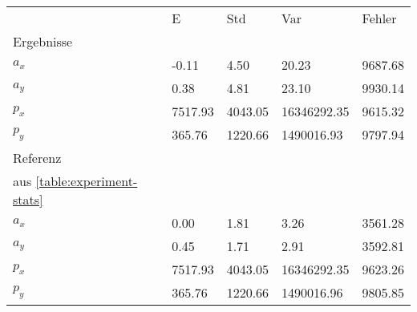 \begin{tabular}{l|l|l|l|l}

     & E   & Std    & Var    & Fehler \\
\hhline{=|=|=|=|=}

Ergebnisse & & & & \\
$a_x$  &        -0.11 &         4.50 &        20.23 &      9687.68 \\
$a_y$  &         0.38 &         4.81 &        23.10 &      9930.14 \\
$p_x$  &      7517.93 &      4043.05 &  16346292.35 &      9615.32 \\
$p_y$  &       365.76 &      1220.66 &   1490016.93 &      9797.94 \\

\hline
Referenz & & & & \\
aus \ref{table:experiment-stats} & & & & \\
$a_x$  &         0.00 &         1.81 &         3.26 &      3561.28 \\
$a_y$  &         0.45 &         1.71 &         2.91 &      3592.81 \\
$p_x$  &      7517.93 &      4043.05 &  16346292.35 &      9623.26 \\
$p_y$  &       365.76 &      1220.66 &   1490016.96 &      9805.85 \\
\end{tabular}
